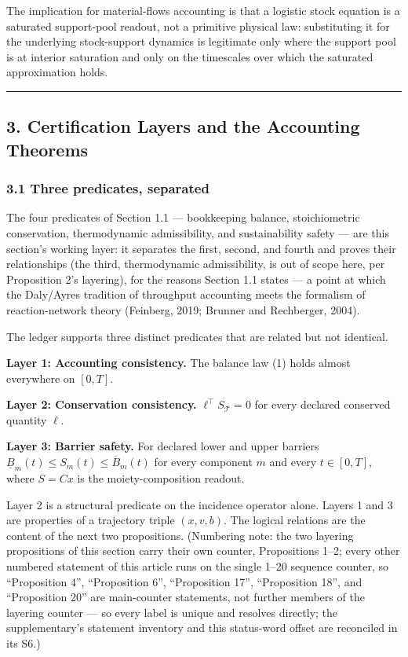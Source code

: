 \documentclass[11pt]{article}
\begin{document}
The implication for material-flows accounting is that a logistic stock
equation is a saturated support-pool readout, not a primitive physical
law: substituting it for the underlying stock-support dynamics is
legitimate only where the support pool is at interior saturation and
only on the timescales over which the saturated approximation holds.

\begin{center}\rule{0.5\linewidth}{0.5pt}\end{center}

\subsection{3. Certification Layers and the Accounting
Theorems}\label{certification-layers-and-the-accounting-theorems}

\subsubsection{3.1 Three predicates,
separated}\label{three-predicates-separated}

The four predicates of Section 1.1 --- bookkeeping balance,
stoichiometric conservation, thermodynamic admissibility, and
sustainability safety --- are this section's working layer: it separates
the first, second, and fourth and proves their relationships (the third,
thermodynamic admissibility, is out of scope here, per Proposition 2's
layering), for the reasons Section 1.1 states --- a point at which the
Daly/Ayres tradition of throughput accounting meets the formalism of
reaction-network theory (Feinberg, 2019; Brunner and Rechberger, 2004).

The ledger supports three distinct predicates that are related but not
identical.

\textbf{Layer 1: Accounting consistency.} The balance law (1) holds
almost everywhere on \([0,T]\).

\textbf{Layer 2: Conservation consistency.}
\(\ell^\top S_{\mathcal{T}} = 0\) for every declared conserved quantity
\(\ell\).

\textbf{Layer 3: Barrier safety.} For declared lower and upper barriers
\(\underline{B}_m(t) \le S_m(t) \le \overline{B}_m(t)\) for every
component \(m\) and every \(t \in [0,T]\), where \(S = Cx\) is the
moiety-composition readout.

Layer 2 is a structural predicate on the incidence operator alone.
Layers 1 and 3 are properties of a trajectory triple \((x, v, b)\). The
logical relations are the content of the next two propositions.
(Numbering note: the two layering propositions of this section carry
their own counter, Propositions 1--2; every other numbered statement of
this article runs on the single 1--20 sequence counter, so ``Proposition
4'', ``Proposition 6'', ``Proposition 17'', ``Proposition 18'', and
``Proposition 20'' are main-counter statements, not further members of
the layering counter --- so every label is unique and resolves directly;
the supplementary's statement inventory and this status-word offset are
reconciled in its S6.)
\end{document}
